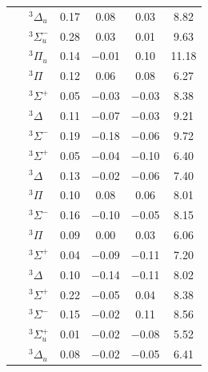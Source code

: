 {\begin{threeparttable}
\begin{tabular}{clcccc}
            & \({}^3\Delta_u\)     &
            \( \)0.17 & \( \)0.08 & \( \)0.03 &  8.82 \\\
            & \({}^3\Sigma_u^-\)   &
            \( \)0.28 & \( \)0.03 & \( \)0.01 &  9.63 \\\
            & \({}^3\Pi_u\)        &
            \( \)0.14 & \(-\)0.01 & \( \)0.10 & 11.18 \\\
            \ce{CO}                            
            & \({}^3\Pi\)          &
            \( \)0.12 & \( \)0.06 & \( \)0.08 &  6.27 \\\
            & \({}^3\Sigma^+\)     &
            \( \)0.05 & \(-\)0.03 & \(-\)0.03 &  8.38 \\\
            & \({}^3\Delta\)       &
            \( \)0.11 & \(-\)0.07 & \(-\)0.03 &  9.21 \\\
            & \({}^3\Sigma^-\)     &
            \( \)0.19 & \(-\)0.18 & \(-\)0.06 &  9.72 \\\
            \ce{HCN}                           
            & \({}^3\Sigma^+\)     &
            \( \)0.05 & \(-\)0.04 & \(-\)0.10 &  6.40 \\
            & \({}^3\Delta\)       &
            \( \)0.13 & \(-\)0.02 & \(-\)0.06 &  7.40 \\
            & \({}^3\Pi\)          &
            \( \)0.10 & \( \)0.08 & \( \)0.06 &  8.01 \\
            & \({}^3\Sigma^-\)     &
            \( \)0.16 & \(-\)0.10 & \(-\)0.05 &  8.15 \\
            \ce{HNC}                                                      
            & \({}^3\Pi\)          &
            \( \)0.09 & \( \)0.00 & \( \)0.03 &  6.06 \\
            & \({}^3\Sigma^+\)     &
            \( \)0.04 & \(-\)0.09 & \(-\)0.11 &  7.20 \\
            & \({}^3\Delta\)       &
            \( \)0.10 & \(-\)0.14 & \(-\)0.11 &  8.02 \\
            & \({}^3\Sigma^+\)     &
            \( \)0.22 & \(-\)0.05 & \( \)0.04 &  8.38 \\
            & \({}^3\Sigma^-\)     &
            \( \)0.15 & \(-\)0.02 & \( \)0.11 &  8.56 \\
            \ce{H2C2}                                                     
            & \({}^3\Sigma_u^+\)   &
            \( \)0.01 & \(-\)0.02 & \(-\)0.08 &  5.52 \\
            & \({}^3\Delta_u\)     &
            \( \)0.08 & \(-\)0.02 & \(-\)0.05 &  6.41 \\

\end{tabular}
\end{threeparttable}}
